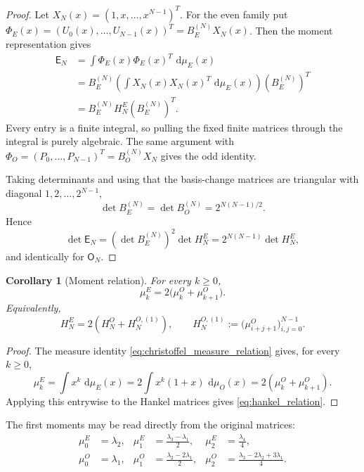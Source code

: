 \documentclass[11pt]{amsart}
\numberwithin{equation}{section}
\theoremstyle{plain}
\newtheorem{corollary}[theorem]{Corollary}
\theoremstyle{definition}
\theoremstyle{remark}
\newcommand{\E}{\mathsf E}
\newcommand{\Omat}{\mathsf O}
\newcommand{\dd}{\,\mathrm d}
\begin{document}
\begin{proof}
Let $X_N(x)=(1,x,\ldots,x^{N-1})^T$.  For the even family put
$\Phi_E(x)=(U_0(x),\ldots,U_{N-1}(x))^T=B_E^{(N)}X_N(x)$.  Then the moment representation gives
\begin{align}
\E_N
&=\int \Phi_E(x)\Phi_E(x)^T\,\dd\mu_E(x)\\
&=B_E^{(N)}\left(\int X_N(x)X_N(x)^T\,\dd\mu_E(x)\right)(B_E^{(N)})^T\\
&=B_E^{(N)}H_N^E(B_E^{(N)})^T.
\end{align}
Every entry is a finite integral, so pulling the fixed finite matrices through the integral is purely algebraic.  The same argument with
$\Phi_O=(P_0,\ldots,P_{N-1})^T=B_O^{(N)}X_N$ gives the odd identity.

Taking determinants and using that the basis-change matrices are triangular with diagonal $1,2,\ldots,2^{N-1}$,
\begin{equation}
\det B_E^{(N)}=\det B_O^{(N)}=2^{N(N-1)/2}.
\end{equation}
Hence
\begin{equation}
\det\E_N=(\det B_E^{(N)})^2\det H_N^E
=2^{N(N-1)}\det H_N^E,
\end{equation}
and identically for $\Omat_N$.
\end{proof}

\begin{corollary}[Moment relation]
\label{cor:moment_relation}
For every $k\ge0$,
\begin{equation}
\mu_k^E=2\bigl(\mu_k^O+\mu_{k+1}^O\bigr).
\label{eq:moment_relation}
\end{equation}
Equivalently,
\begin{equation}
H_N^E=2\left(H_N^O+H_N^{O,(1)}\right),
\qquad
H_N^{O,(1)}:=\bigl(\mu_{i+j+1}^O\bigr)_{i,j=0}^{N-1}.
\label{eq:hankel_relation}
\end{equation}
\end{corollary}

\begin{proof}
The measure identity \eqref{eq:christoffel_measure_relation} gives, for every \(k\ge0\),
\[
\mu_k^E=\int x^k\,\dd\mu_E(x)
=2\int x^k(1+x)\,\dd\mu_O(x)
=2(\mu_k^O+\mu_{k+1}^O).
\]
Applying this entrywise to the Hankel matrices gives \eqref{eq:hankel_relation}.
\end{proof}

The first moments may be read directly from the original matrices:
\begin{align}
\mu_0^E&=\lambda_2,
&\mu_1^E&=\frac{\lambda_3-\lambda_1}{2},
&\mu_2^E&=\frac{\lambda_4}{4},
\label{eq:first_E_moments}\\
\mu_0^O&=\lambda_1,
&\mu_1^O&=\frac{\lambda_2-2\lambda_1}{2},
&\mu_2^O&=\frac{\lambda_3-2\lambda_2+3\lambda_1}{4}.
\label{eq:first_O_moments}
\end{align}
\end{document}
